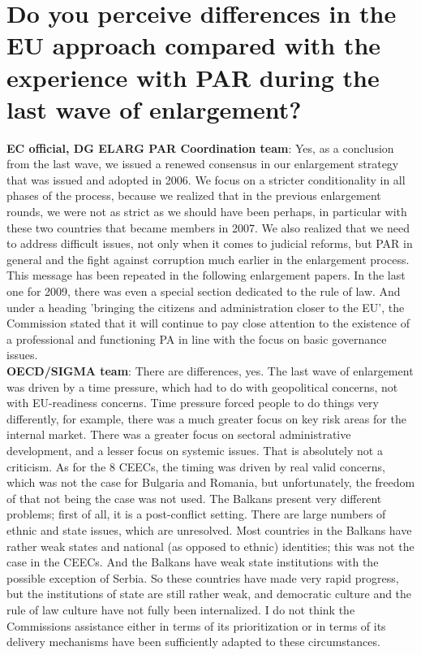 \section{Do you perceive differences in the EU approach compared with the experience with PAR during the last wave of enlargement? }
\textbf{EC official, DG ELARG PAR Coordination team}: Yes, as a conclusion from the last wave, we issued a renewed consensus in our enlargement strategy that was issued and adopted in 2006. We focus on a stricter conditionality in all phases of the process, because we realized that in the previous enlargement rounds, we were not as strict as we should have been perhaps, in particular with these two countries that became members in 2007. We also realized that we need to address difficult issues, not only when it comes to judicial reforms, but PAR in general and the fight against corruption much earlier in the enlargement process. This message has been repeated in the following enlargement papers. In the last one for 2009, there was even a special section dedicated to the rule of law. And under a heading 'bringing the citizens and administration closer to the EU', the Commission stated that it will continue to pay close attention to the existence of a professional and functioning PA in line with the focus on basic governance issues. \\
\textbf{OECD/SIGMA team}: There are differences, yes. The last wave of enlargement was driven by a time pressure, which had to do with geopolitical concerns, not with EU-readiness concerns. Time pressure forced people to do things very differently, for example, there was a much greater focus on key risk areas for the internal market. There was a greater focus on sectoral administrative development, and a lesser focus on systemic issues. That is absolutely not a criticism. As for the 8 CEECs, the timing was driven by real valid concerns, which was not the case for Bulgaria and Romania, but unfortunately, the freedom of that not being the case was not used. The Balkans present very different problems; first of all, it is a post-conflict setting. There are large numbers of ethnic and state issues, which are unresolved. Most countries in the Balkans have rather weak states and national (as opposed to ethnic) identities; this was not the case in the CEECs. And the Balkans have weak state institutions with the possible exception of Serbia. So these countries have made very rapid progress, but the institutions of state are still rather weak, and democratic culture and the rule of law culture have not fully been internalized. I do not think the Commissions assistance either in terms of its prioritization or in terms of its delivery mechanisms have been sufficiently adapted to these circumstances. \\
